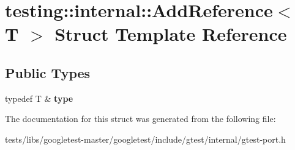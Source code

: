 \hypertarget{structtesting_1_1internal_1_1AddReference}{}\section{testing\+:\+:internal\+:\+:Add\+Reference$<$ T $>$ Struct Template Reference}
\label{structtesting_1_1internal_1_1AddReference}
\subsection*{Public Types}
\begin{DoxyCompactItemize}
\item 
\mbox{\label{structtesting_1_1internal_1_1AddReference_a2df8dd7c4e41f6390e6e66b1a9a67bb4}} 
typedef T \& {\bfseries type}
\end{DoxyCompactItemize}


The documentation for this struct was generated from the following file\+:\begin{DoxyCompactItemize}
\item 
tests/libs/googletest-\/master/googletest/include/gtest/internal/gtest-\/port.\+h\end{DoxyCompactItemize}
